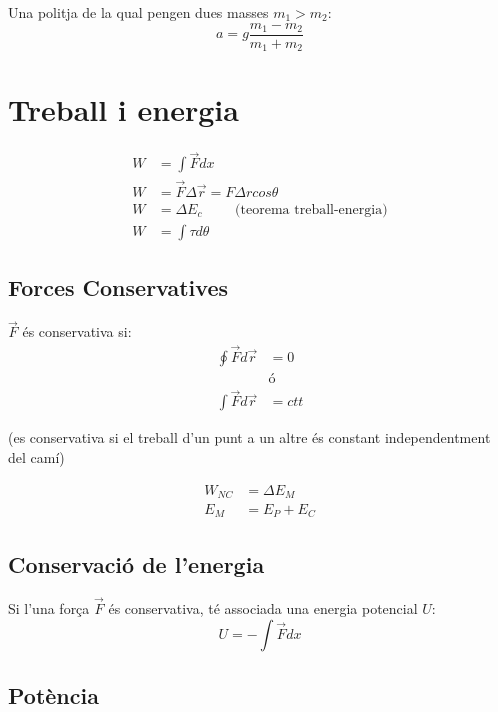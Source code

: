 Una politja de la qual pengen dues masses $m_1 > m_2$:
\begin{equation}
    a = g\frac{m_1-m_2}{m_1+m_2}
\end{equation} 

\section{Treball i energia}
\label{sec:treball_i_energia}

\begin{align}
    W &= \int \vec{F}dx \\
    W &= \vec{F}\Delta \vec{r} = F  \Delta r  cos\theta \\
    W &= \Delta E_c \qquad \text{ (teorema treball-energia)} \\
    W &= \int \tau d\theta
\end{align}

\subsection{Forces Conservatives}
\label{sub:forces_conservatives}

$\vec{F}$ és conservativa si:
\begin{align*}
    \oint \vec{F}d\vec{r} &= 0 \\
    &\text{ó} \\
    \int \vec{F}d\vec{r} &= ctt
\end{align*}

\begin{center}
    (es conservativa si el treball d'un punt a un altre és constant independentment del camí)
\end{center}

\begin{align}
    W_{NC} &= \Delta E_M \\
    E_M &= E_P + E_C
\end{align}

\subsection{Conservació de l'energia}
\label{sub:conservacio_de_l_energia}

Si l'una força $\vec{F}$ és conservativa, té associada una energia potencial $U$:
\begin{equation}
    U = - \int \vec{F} dx 
\end{equation}

\subsection{Potència}
\label{sub:potencia}

